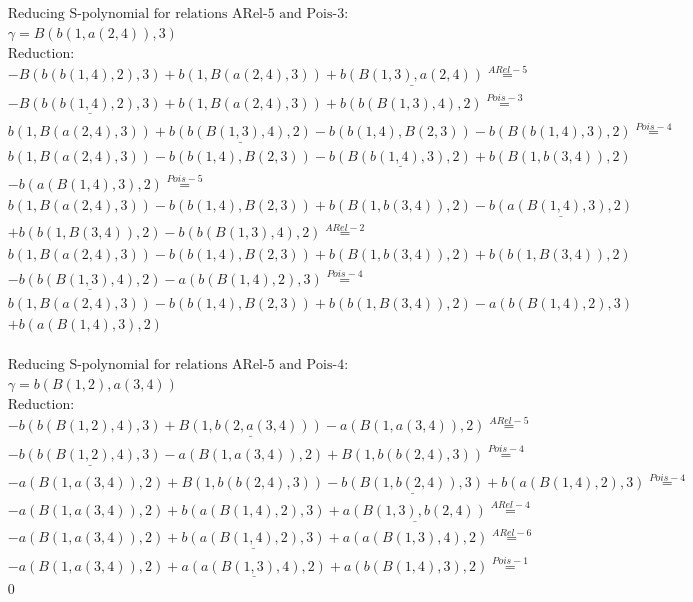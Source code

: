\documentclass[11pt]{amsart}
\begin{document}
\begin{align*} 
& \text{Reducing S-polynomial for relations ARel-5 and Pois-3:} \\ 
& \gamma = B(b(1,a(2,4)),3) \\ 
& \text{Reduction}: \\& - B(b(b(1,4),2),3) + b(1,B(a(2,4),3)) + \underline{b(B(1,3),a(2,4))} \stackrel{ ARel-5 }{=}  \\ 
& - \underline{B(b(b(1,4),2),3)} + b(1,B(a(2,4),3)) + b(b(B(1,3),4),2) \stackrel{ Pois-3 }{=}  \\ 
&b(1,B(a(2,4),3)) + \underline{b(b(B(1,3),4),2)} - b(b(1,4),B(2,3)) - b(B(b(1,4),3),2) \stackrel{ Pois-4 }{=}  \\ 
&b(1,B(a(2,4),3)) - b(b(1,4),B(2,3)) - \underline{b(B(b(1,4),3),2)} + b(B(1,b(3,4)),2)\\ 
 &  - b(a(B(1,4),3),2) \stackrel{ Pois-5 }{=}  \\ 
&b(1,B(a(2,4),3)) - b(b(1,4),B(2,3)) + b(B(1,b(3,4)),2) - \underline{b(a(B(1,4),3),2)}\\ 
 &  + b(b(1,B(3,4)),2) - b(b(B(1,3),4),2) \stackrel{ ARel-2 }{=}  \\ 
&b(1,B(a(2,4),3)) - b(b(1,4),B(2,3)) + b(B(1,b(3,4)),2) + b(b(1,B(3,4)),2)\\ 
 &  - \underline{b(b(B(1,3),4),2)} - a(b(B(1,4),2),3) \stackrel{ Pois-4 }{=}  \\ 
&b(1,B(a(2,4),3)) - b(b(1,4),B(2,3)) + b(b(1,B(3,4)),2) - a(b(B(1,4),2),3)\\ 
 &  + b(a(B(1,4),3),2)\\ 
\end{align*} 
 
\begin{align*} 
& \text{Reducing S-polynomial for relations ARel-5 and Pois-4:} \\ 
& \gamma = b(B(1,2),a(3,4)) \\ 
& \text{Reduction}: \\& - b(b(B(1,2),4),3) + \underline{B(1,b(2,a(3,4)))} - a(B(1,a(3,4)),2) \stackrel{ ARel-5 }{=}  \\ 
& - \underline{b(b(B(1,2),4),3)} - a(B(1,a(3,4)),2) + B(1,b(b(2,4),3)) \stackrel{ Pois-4 }{=}  \\ 
& - a(B(1,a(3,4)),2) + B(1,b(b(2,4),3)) - \underline{b(B(1,b(2,4)),3)} + b(a(B(1,4),2),3) \stackrel{ Pois-4 }{=}  \\ 
& - a(B(1,a(3,4)),2) + b(a(B(1,4),2),3) + \underline{a(B(1,3),b(2,4))} \stackrel{ ARel-4 }{=}  \\ 
& - a(B(1,a(3,4)),2) + \underline{b(a(B(1,4),2),3)} + a(a(B(1,3),4),2) \stackrel{ ARel-6 }{=}  \\ 
& - a(B(1,a(3,4)),2) + \underline{a(a(B(1,3),4),2)} + a(b(B(1,4),3),2) \stackrel{ Pois-1 }{=}  \\ 
&0\\ 
\end{align*} 
 
\end{document}
